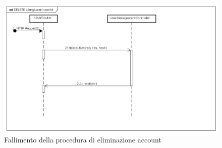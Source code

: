 \begin{itemize}
\label{Fallimento della procedura di eliminazione account}
\begin{figure}[ht]
	\centering
	\includegraphics[scale=0.40]{UML/DiagrammiDiSequenza/Back-end/DELETE_LangUserUseridFailure.png}
	\caption{Fallimento della procedura di eliminazione account}
\end{figure}

\FloatBarrier
\end{itemize}

